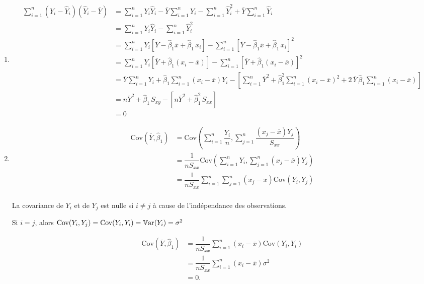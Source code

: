 \documentclass[letter, 11pt]{article}
\begin{document}
\begin{enumerate}[leftmargin=*, wide, label=\bf Exercice \arabic*:]
{\begin{enumerate}
\item $$\begin{array}{ll}
    \sum\limits_{i=1}^n (Y_i-\widehat Y_i)(\widehat Y_i-\overline Y)
    &= \sum\limits_{i=1}^n Y_i\widehat Y_i- \overline Y\sum\limits_{i=1}^n Y_i- \sum\limits_{i=1}^n \hat Y^2_i+ \overline Y\sum\limits_{i=1}^n \widehat Y_i\\[6mm]
    &= \sum\limits_{i=1}^n Y_i\widehat Y_i-  \sum\limits_{i=1}^n \hat Y^2_i\\[6mm]
    &= \sum\limits_{i=1}^n Y_i [\overline Y - \widehat\beta_1\overline x +\widehat\beta_1\,x_i]- \sum\limits_{i=1}^n [\overline Y - \widehat\beta_1\overline x +\widehat\beta_1\,x_i]^2\\[6mm]
    &= \sum\limits_{i=1}^n Y_i [\overline Y +\widehat\beta_1(x_i-\overline x) ]- \sum\limits_{i=1}^n [\overline Y +\widehat\beta_1(x_i-\overline x) ]^2\\[6mm]
    &= \overline Y \sum\limits_{i=1}^n Y_i  +\widehat\beta_1\sum\limits_{i=1}^n(x_i-\overline x)Y_i -\left[ \sum\limits_{i=1}^n \overline Y^2 +\widehat\beta_1^2\sum\limits_{i=1}^n(x_i-\overline x)^2 + 2\,\overline Y\,\widehat\beta_1\sum\limits_{i=1}^n(x_i-\overline x)\right]\\[6mm]
    &= n\overline Y^2 +\widehat\beta_1\,S_{xy}  -\left[n \overline Y^2 +\widehat\beta_1^2\,S_{xx} \right]\\[6mm]
    &=0  
    \end{array}$$
\item  $$\begin{array}{ll}
    \text{Cov}(\overline Y,\widehat\beta_1)
    &=  \text{Cov}\left(\sum\limits_{i=1}^n\dfrac{Y_i}{n}, \sum\limits_{j=1}^n \dfrac{(x_j-\overline x)Y_j}{S_{xx}}\right) \\[6mm]
    &= \dfrac{1}{nS_{xx}}\text{Cov}\left(\sum\limits_{i=1}^n Y_i ,\sum\limits_{j=1}^n (x_j-\overline x)Y_j\right) \\[6mm]
    &= \dfrac{1}{nS_{xx}}\sum\limits_{i=1}^n\sum\limits_{j=1}^n (x_j-\overline x)\text{Cov}\left( Y_i ,Y_j\right) \\[3mm]
    \end{array}$$

    La covariance de $Y_i$ et de $Y_j$ est nulle si $i\ne j$ à cause de l'indépendance des observations.
    
    Si $i=j$, alors $\text{Cov}( Y_i ,Y_j)=\text{Cov}( Y_i ,Y_i)=\mathbb{V}\text{ar}(Y_i)=\sigma^2$

$$\begin{array}{ll}
    \text{Cov}(\overline Y,\widehat\beta_1)
    &= \dfrac{1}{nS_{xx}}\sum\limits_{i=1}^n(x_i-\overline x)\text{Cov}\left( Y_i ,Y_i\right) \\[6mm]
    &= \dfrac{1}{nS_{xx}}\sum\limits_{i=1}^n(x_i-\overline x)\sigma^2\\[6mm]
    &=0.
    \end{array}$$
    \end{enumerate}}




\end{enumerate}
\end{document}
